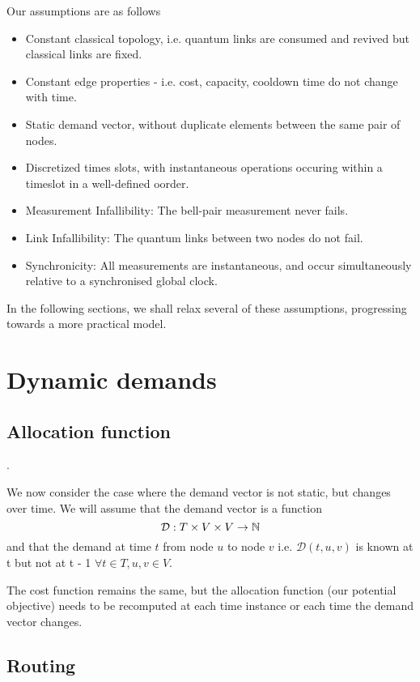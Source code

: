 \documentclass{amsart}
\begin{document}
    Our assumptions are as follows
    \begin{itemize}
        \item Constant classical topology, i.e. quantum links are consumed and revived but classical links are fixed.
        \item Constant edge properties - i.e. cost, capacity, cooldown time do not change with time.
        \item Static demand vector, without duplicate elements between the same pair of nodes.
        \item Discretized times slots, with instantaneous operations occuring within a timeslot in a well-defined oorder.
        \item Measurement Infallibility: The bell-pair measurement never fails.
        \item Link Infallibility: The quantum links between two nodes do not fail.
        \item Synchronicity: All measurements are instantaneous, and occur simultaneously relative to a synchronised global clock.
    \end{itemize}

    In the following sections, we shall relax several of these assumptions, progressing towards a more practical model.

    \section{Dynamic demands}

    \subsection{Allocation function}.

    We now consider the case where the demand vector is not static, but changes over time. We will assume that the demand vector is a function \[\mathcal{D} : T \times V \times V \rightarrow \mathbb{N}\] and that the demand at time \(t\) from node \(u\) to node \(v\) i.e. \(\mathcal{D}(t, u, v)\) is known at t but not at t - 1 \(\forall t \in T, u, v \in V\).

    The cost function remains the same, but the allocation function (our potential objective) needs to be recomputed at each time instance or each time the demand vector changes.

    \subsection{Routing}
\end{document}
